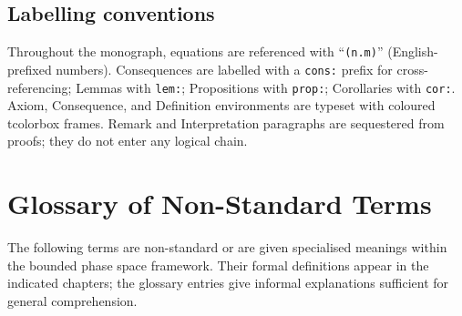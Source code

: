 \subsection*{Labelling conventions}

Throughout the monograph, equations are referenced with
``\texttt{(n.m)}'' (English-prefixed numbers).  Consequences are labelled
with a \texttt{cons:} prefix for cross-referencing; Lemmas with
\texttt{lem:}; Propositions with \texttt{prop:}; Corollaries with
\texttt{cor:}.  Axiom, Consequence, and Definition environments are
typeset with coloured tcolorbox frames.  Remark and Interpretation
paragraphs are sequestered from proofs; they do not enter any logical chain.

\section*{Glossary of Non-Standard Terms}

The following terms are non-standard or are given specialised meanings
within the bounded phase space framework.  Their formal definitions appear
in the indicated chapters; the glossary entries give informal explanations
sufficient for general comprehension.

